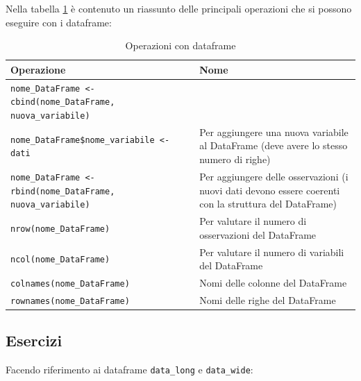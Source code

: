 \documentclass[
]{book}
\begin{document}
Nella tabella \ref{tab:frame-tab} è contenuto un riassunto delle principali operazioni che si possono eseguire con i dataframe:

\begin{table}[!h]

\caption{\label{tab:frame-tab}Operazioni con dataframe}
\centering
\begin{tabular}[t]{l|l}
\hline
Operazione & Nome\\
\hline
\texttt{nome\_DataFrame <- cbind(nome\_DataFrame, nuova\_variabile)} \\ \texttt{nome\_DataFrame\$nome\_variabile <- dati} & Per aggiungere una nuova variabile al DataFrame (deve avere lo stesso numero di righe)\\
\hline
\texttt{nome\_DataFrame <- rbind(nome\_DataFrame, nuova\_variabile)} & Per aggiungere delle osservazioni (i nuovi dati devono essere coerenti con la struttura del DataFrame)\\
\hline
\texttt{nrow(nome\_DataFrame)} & Per valutare il numero di osservazioni del DataFrame\\
\hline
\texttt{ncol(nome\_DataFrame)} & Per valutare il numero di variabili del DataFrame\\
\hline
\texttt{colnames(nome\_DataFrame)} & Nomi delle colonne del DataFrame\\
\hline
\texttt{rownames(nome\_DataFrame)} & Nomi delle righe del DataFrame\\
\hline
\end{tabular}
\end{table}

\hypertarget{esercizi-10}{%
\subsection*{Esercizi}\label{esercizi-10}}

Facendo riferimento ai dataframe \texttt{data\_long} e \texttt{data\_wide}:
\end{document}
